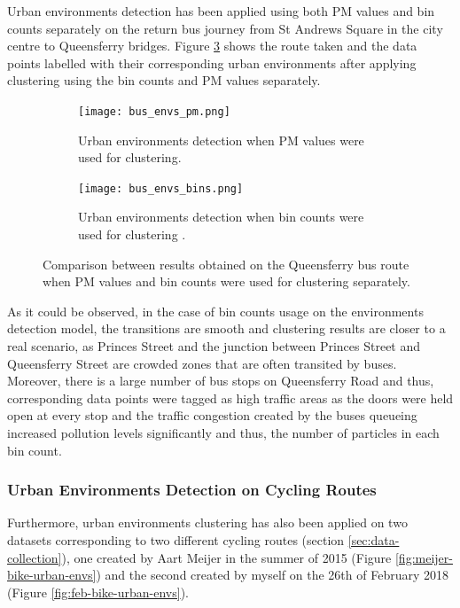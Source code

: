 \documentclass[bsc,frontabs,twoside,singlespacing, parskip,deptreport]{infthesis}     %
\begin{document}
Urban environments detection has been applied using both PM values and bin counts separately on the return bus journey from St Andrews Square in the city centre to Queensferry bridges. Figure \ref{fig:queensferry-urban-environments} shows the route taken and the data points labelled with their corresponding urban environments after applying clustering using the bin counts and PM values separately.

\begin{figure}[h!]
  \begin{subfigure}[t]{\textwidth}
    \texttt{[image: bus\_envs\_pm.png]}
    \caption{Urban environments detection when PM values were used for clustering.}
    \label{fig:queensferry-env-pm}
  \end{subfigure}
  \hfill
  \begin{subfigure}[t]{\textwidth}
    \texttt{[image: bus\_envs\_bins.png]}
    \caption{Urban environments detection when bin counts were used for clustering .}
    \label{fig:queensferry-env-bins}
  \end{subfigure}
  \caption{Comparison between results obtained on the Queensferry bus route when PM values and bin counts were used for clustering separately.}
  \label{fig:queensferry-urban-environments}
\end{figure}

As it could be observed, in the case of bin counts usage on the environments detection model, the transitions are smooth and clustering results are closer to a real scenario, as Princes Street and the junction between Princes Street and Queensferry Street are crowded zones that are often transited by buses. Moreover, there is a large number of bus stops on Queensferry Road and thus, corresponding data points were tagged as high traffic areas as the doors were held open at every stop and the traffic congestion created by the buses queueing increased pollution levels significantly and thus, the number of particles in each bin count.


\subsubsection*{Urban Environments Detection on Cycling Routes}

Furthermore, urban environments clustering has also been applied on two datasets corresponding to two different cycling routes (section \ref{sec:data-collection}), one created by Aart Meijer in the summer of 2015 (Figure \ref{fig:meijer-bike-urban-envs}) and the second created by myself on the 26th of February 2018 (Figure \ref{fig:feb-bike-urban-envs}).
\end{document}
